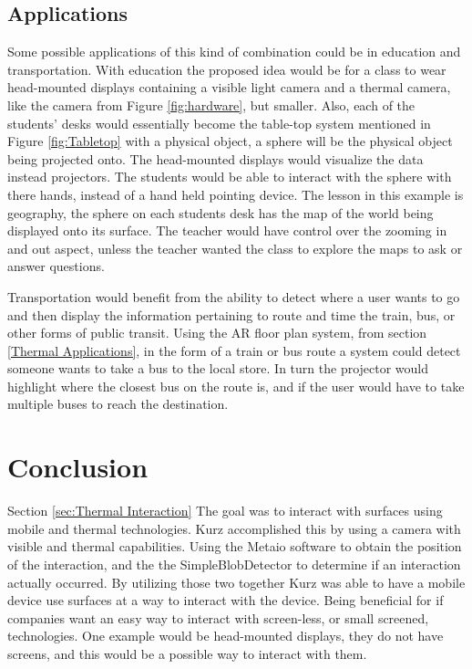 \documentclass{sig-alternate}
\begin{document}
\subsection{Applications}
\label{Applications}
Some possible applications of this kind of combination could be in education and transportation. With education the proposed idea would be for a class to wear head-mounted displays containing a visible light camera and a thermal camera, like the camera from Figure \ref{fig:hardware}, but smaller. Also, each of the students' desks would essentially become the table-top system mentioned in Figure \ref{fig:Tabletop} with a physical object, a sphere will be the physical object being projected onto. The head-mounted displays would visualize the data instead projectors. The students would be able to interact with the sphere with there hands, instead of a hand held pointing device. The lesson in this example is geography, the sphere on each students desk has the map of the world being displayed onto its surface. The teacher would have control over the zooming in and out aspect, unless the teacher wanted the class to explore the maps to ask or answer questions. 

Transportation would benefit from the ability to detect where a user wants to go and then display the information pertaining to route and time the train, bus, or other forms of public transit. Using the AR floor plan system, from section \ref{Thermal Applications}, in the form of a train or bus route a system could detect someone wants to take a bus to the local store. In turn the projector would highlight where the closest bus on the route is, and if the user would have to take multiple buses to reach the destination. 


\section{Conclusion}
\label{Conclusion}
Section \ref{sec:Thermal Interaction} The goal was to interact with surfaces using mobile and thermal technologies. Kurz \cite{Thermal} accomplished this by using a camera with visible and thermal capabilities. Using the Metaio software to obtain the position of the interaction, and the the SimpleBlobDetector to determine if an interaction actually occurred. By utilizing those two together Kurz was able to have a mobile device use surfaces at a way to interact with the device. Being beneficial for if companies want an easy way to interact with screen-less, or small screened, technologies. One example would be head-mounted displays, they do not have screens, and this would be a possible way to interact with them.  
\end{document}
